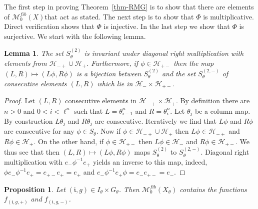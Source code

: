 \documentclass[10pt,a4paper]{amsart}
\newtheorem{lemma}[theorem]{Lemma}
\newtheorem{prop}[theorem]{Proposition}
\numberwithin{equation}{section}
\newcommand{\ii}{{\mathfrak i}}
\newcommand{\Hh}{{\mathcal H}}
\newcommand{\M}{\mathcal M}
\newcommand{\Sfib}{\M^{fib}_0(X_\theta)}
\begin{document}
 The first step in proving Theorem~\ref{thm-RMG}  is to show that there are  elements of $\M^{fib}_0(X)$that  act as stated. The next step is to show that $\Phi$ is multiplicative. 
Direct verification shows that $\Phi$ is injective. In the last step we show that $\Phi$ is surjective. We start with the following  lemma.
\begin{lemma} \label{lem-neg}
The set $S^{(2)}_\theta$ is invariant under diagonal right multiplication with elements from $\Hh_{-+}\cup \Hh_{+}$. Furthermore, if 
$\phi \in\Hh_{+-}$ then  %
the map $(L,R) \mapsto (L\phi,R\phi)$ is a bijection between $S^{(2)}_\theta$ and the set $S^{(2,-)}_\theta$ of consecutive elements $(L,R)$ which lie in $\Hh_{-}\times\Hh_{+-}$. 
\end{lemma}
\begin{proof} Let $(L,R)$ consecutive elements in $\Hh_{-+}\times \Hh_{+}$. By definition %
there are $n>0$ and $0 < i < \ell^n$ such that $L=\theta^n_{i-1}$ and $R=\theta^n_{i}$. Let $\theta_j$ be a column map. By construction $L\theta_j$ and $R\theta_j$ are consecutive. Iteratively we find that 
 $L\phi$ and $R\phi$ are consecutive for any $\phi\in S_\theta$. Now if $\phi\in \Hh_{-+}\cup \Hh_{+}$ then $L\phi \in \Hh_{-+}$  and $R\phi \in \Hh_{+}$. On the other hand, if $\phi\in \Hh_{+-}$ then  $L\phi\in \Hh_{-}$ and $R\phi\in \Hh_{+-}$. We thus see that then $(L,R) \mapsto (L\phi,R\phi)$ maps $S^{(2)}_\theta$ to $S^{(2,-)}_\theta$. Diagonal right multiplication with $e_-\phi^{-1} e_+$ yields an inverse to this map, indeed, $\phi e_-\phi^{-1} e_+ = e_{+-}e_+ = e_+$ and $e_-\phi^{-1} e_+ \phi= e_- e_{+-} = e_-$.
\end{proof}
\begin{prop} \label{prop-hin}
Let $(\ii ,g)\in I_\theta \times G_\theta$.
Then $\Sfib$ contains the functions 
$f_{(\ii ,g,+ )}$ and $f_{(\ii ,g,-)}$.
\end{prop}
\end{document}
